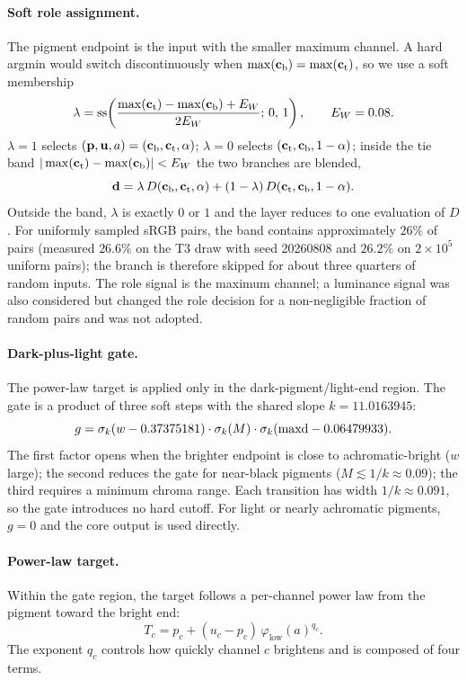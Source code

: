 \paragraph{Soft role assignment.}
\label{sec:role}
The pigment endpoint is the input with the smaller maximum channel. A hard argmin would switch discontinuously when $\max(\mathbf{c}_{\mathrm{b}})=\max(\mathbf{c}_{\mathrm{t}})$, so we use a soft membership
\begin{equation}
\lambda=\operatorname{ss}\!\left(\frac{\max(\mathbf{c}_{\mathrm{t}})-\max(\mathbf{c}_{\mathrm{b}})+E_{W}}{2E_{W}};\,0,\,1\right),
\qquad E_{W}=0.08.
\label{eq:lambda}
\end{equation}
$\lambda=1$ selects $(\mathbf{p},\mathbf{u},a)=(\mathbf{c}_{\mathrm{b}},\mathbf{c}_{\mathrm{t}},\alpha)$; $\lambda=0$ selects $(\mathbf{c}_{\mathrm{t}},\mathbf{c}_{\mathrm{b}},1-\alpha)$; inside the tie band $|\max(\mathbf{c}_{\mathrm{t}})-\max(\mathbf{c}_{\mathrm{b}})|<E_{W}$ the two branches are blended,
\begin{equation}
\mathbf{d}=\lambda\,D(\mathbf{c}_{\mathrm{b}},\mathbf{c}_{\mathrm{t}},\alpha)+(1-\lambda)\,D(\mathbf{c}_{\mathrm{t}},\mathbf{c}_{\mathrm{b}},1-\alpha).
\label{eq:dblend}
\end{equation}
Outside the band, $\lambda$ is exactly $0$ or $1$ and the layer reduces to one evaluation of $D$. For uniformly sampled sRGB pairs, the band contains approximately $26\%$ of pairs (measured $26.6\%$ on the T3 draw with seed 20260808 and $26.2\%$ on $2\times10^{5}$ uniform pairs); the branch is therefore skipped for about three quarters of random inputs. The role signal is the maximum channel; a luminance signal was also considered but changed the role decision for a non-negligible fraction of random pairs and was not adopted.

\paragraph{Dark-plus-light gate.}
The power-law target is applied only in the dark-pigment/light-end region. The gate is a product of three soft steps with the shared slope $k=11.0163945$:
\begin{equation}
g=\sigma_{k}(w-0.37375181)\cdot\sigma_{k}(M)\cdot\sigma_{k}(\mathrm{maxd}-0.06479933).
\label{eq:gate}
\end{equation}
The first factor opens when the brighter endpoint is close to achromatic-bright ($w$ large); the second reduces the gate for near-black pigments ($M\lesssim1/k\approx0.09$); the third requires a minimum chroma range. Each transition has width $1/k\approx0.091$, so the gate introduces no hard cutoff. For light or nearly achromatic pigments, $g=0$ and the core output is used directly.

\paragraph{Power-law target.}
Within the gate region, the target follows a per-channel power law from the pigment toward the bright end:
\begin{equation}
T_{c}=p_{c}+(u_{c}-p_{c})\,\varphi_{\mathrm{low}}(a)^{q_{c}}.
\label{eq:target}
\end{equation}
The exponent $q_{c}$ controls how quickly channel $c$ brightens and is composed of four terms.

